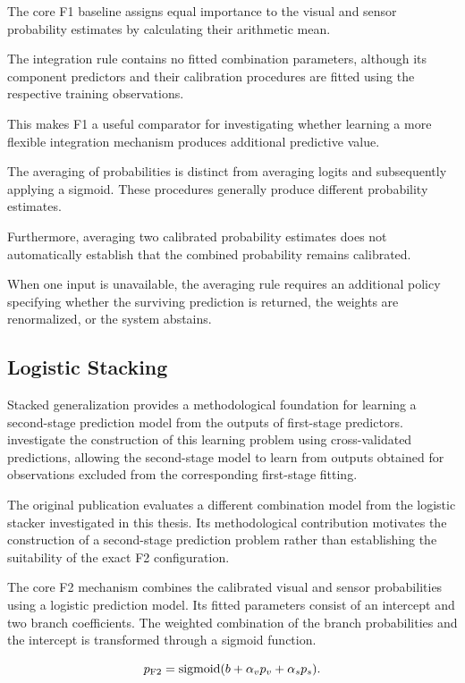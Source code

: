 The core F1 baseline assigns equal importance to the visual and sensor probability estimates by calculating their arithmetic mean.

The integration rule contains no fitted combination parameters, although its component predictors and their calibration procedures are fitted using the respective training observations.

This makes F1 a useful comparator for investigating whether learning a more flexible integration mechanism produces additional predictive value.

The averaging of probabilities is distinct from averaging logits and subsequently applying a sigmoid. These procedures generally produce different probability estimates.

Furthermore, averaging two calibrated probability estimates does not automatically establish that the combined probability remains calibrated.

When one input is unavailable, the averaging rule requires an additional policy specifying whether the surviving prediction is returned, the weights are renormalized, or the system abstains.

\subsection{Logistic Stacking}

Stacked generalization provides a methodological foundation for learning a second-stage prediction model from the outputs of first-stage predictors. \textcite{Ting1999Issues} investigate the construction of this learning problem using cross-validated predictions, allowing the second-stage model to learn from outputs obtained for observations excluded from the corresponding first-stage fitting.

The original publication evaluates a different combination model from the logistic stacker investigated in this thesis. Its methodological contribution motivates the construction of a second-stage prediction problem rather than establishing the suitability of the exact F2 configuration.

The core F2 mechanism combines the calibrated visual and sensor probabilities using a logistic prediction model. Its fitted parameters consist of an intercept and two branch coefficients. The weighted combination of the branch probabilities and the intercept is transformed through a sigmoid function.

\begin{equation}
 p_{\mathrm{F2}}=\operatorname{sigmoid}(b+\alpha_v p_v+\alpha_s p_s).
 \label{eq:f2}
\end{equation}

